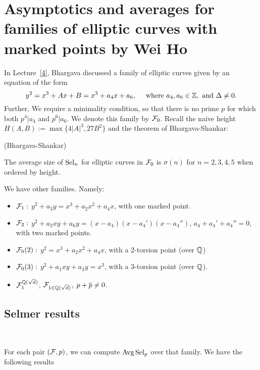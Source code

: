 \documentclass[12pt,amsfont]{amsart}
\begin{document}
\newpage
\renewcommand{\thesubsection}{\arabic{section}.\arabic{subsection}}

\section{Asymptotics and averages for families of elliptic curves with marked points
by Wei Ho}\label{5}

In Lecture~\ref{4}, Bhargava discussed a family of elliptic curves given by an equation of the form 
\[
y^2 = x^3 + Ax + B = x^3 + a_4 x + a_6, \quad\text{ where }a_4, a_6 \in {\mathbb Z},\text{ and }\Delta \ne 0.
\]
Further, We require a minimality condition, so that there is no prime $p$ for which both $p^4 | a_4$ and $p^6 | a_6$. We denote this family by $\mathcal{F}_0$. Recall the naive height $H(A,B) := \max\{4|A|^3, 27B^2\}$ and the theorem of Bhargava-Shankar:

\begin{thm} \label{5T1} (Bhargava-Shankar) 

The average size of $\operatorname{Sel}_n$ for elliptic curves in $\mathcal{F}_0$ is $\sigma(n)$ for $n = 2, 3, 4, 5$ when ordered by height.
\end{thm}
We have other families. Namely:
\begin{itemize}
\item 
$\mathcal{F}_1:$ $y^2 + a_3 y = x^3 + a_2 x^2 + a_4 x$, with one marked point. 
\item
$\mathcal{F}_2:$ $y^2 + a_2 xy + a_6 y = (x - a_4)(x - a_4')(x - a_4'')$, $a_4 + a_4' + a_4'' = 0$, with two marked points.
\item
$\mathcal{F}_0(2):$ $y^2 = x^3 + a_2 x^2 + a_4 x$, with a $2$-torsion point (over ${\mathbb Q}$)
\item
$\mathcal{F}_0(3):$ $y^2 + a_1 xy + a_3 y = x^3$, with a $3$-torsion point (over ${\mathbb Q}$).
\item
$\mathcal{F}_1^{{\mathbb Q}(\sqrt{d})}$, $\mathcal{F}_{1 \in {\mathbb Q}(\sqrt{d})}$, $p + \overline{p} \ne 0$. 

\end{itemize}

\subsection{Selmer results}
{\ }

For each pair $(\mathcal{F}, p)$, we can compute  $\operatorname{Avg} \operatorname{Sel}_p$ over that family. We have the following results
\end{document}
